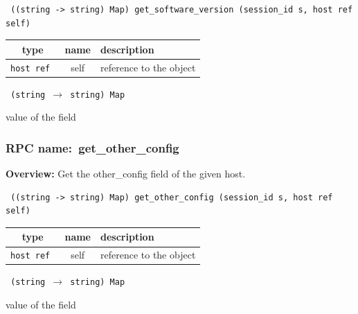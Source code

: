 \begin{verbatim} ((string -> string) Map) get_software_version (session_id s, host ref self)\end{verbatim}



 
\vspace{0.3cm}
\begin{tabular}{|c|c|p{7cm}|}
 \hline
{\bf type} & {\bf name} & {\bf description} \\ \hline
{\tt host ref } & self & reference to the object \\ \hline 

\end{tabular}

\vspace{0.3cm}

{\tt 
(string $\rightarrow$ string) Map
}


value of the field
\vspace{0.3cm}
\vspace{0.3cm}
\vspace{0.3cm}
\subsubsection{RPC name:~get\_other\_config}

{\bf Overview:} 
Get the other\_config field of the given host.

\begin{verbatim} ((string -> string) Map) get_other_config (session_id s, host ref self)\end{verbatim}



 
\vspace{0.3cm}
\begin{tabular}{|c|c|p{7cm}|}
 \hline
{\bf type} & {\bf name} & {\bf description} \\ \hline
{\tt host ref } & self & reference to the object \\ \hline 

\end{tabular}

\vspace{0.3cm}

{\tt 
(string $\rightarrow$ string) Map
}


value of the field
\vspace{0.3cm}
\vspace{0.3cm}
\vspace{0.3cm}
